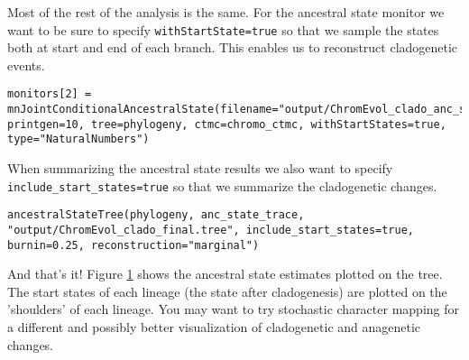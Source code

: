 Most of the rest of the analysis is the same.
For the ancestral state monitor we want to be sure to specify 
\texttt{withStartState=true} so that we sample the states both at
start and end of each branch. This enables us to reconstruct cladogenetic events.
{\tt \begin{snugshade*}
\begin{lstlisting}
monitors[2] = mnJointConditionalAncestralState(filename="output/ChromEvol_clado_anc_states.log", printgen=10, tree=phylogeny, ctmc=chromo_ctmc, withStartStates=true, type="NaturalNumbers")
\end{lstlisting}
\end{snugshade*}}
When summarizing the ancestral state results we also want to specify 
\texttt{include\_start\_states=true} so that we summarize the cladogenetic changes.
{\tt \begin{snugshade*}
\begin{lstlisting}
ancestralStateTree(phylogeny, anc_state_trace, "output/ChromEvol_clado_final.tree", include_start_states=true, burnin=0.25, reconstruction="marginal")
\end{lstlisting}
\end{snugshade*}}
And that's it!
Figure \ref{fig:chromevol_clado} shows the ancestral state estimates plotted on the
tree. The start states of each lineage (the state after cladogenesis) are plotted
on the 'shoulders' of each lineage.
You may want to try stochastic character mapping for a different and possibly better
visualization of cladogenetic and anagenetic changes.
\begin{figure}[h!]
\label{fig:chromevol_clado}
\end{figure}


\newpage

